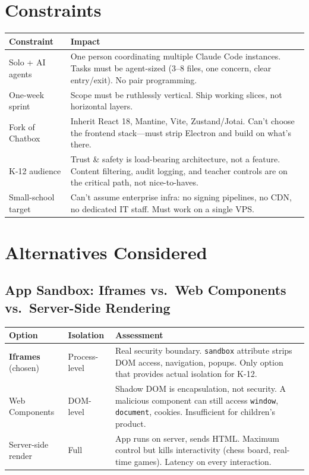 \documentclass[11pt,letterpaper]{article}
\begin{document}
\section*{Constraints}

\begin{tabularx}{\textwidth}{l X}
\toprule
\textbf{Constraint} & \textbf{Impact} \\
\midrule
Solo + AI agents & One person coordinating multiple Claude Code instances. Tasks must be agent-sized (3--8 files, one concern, clear entry/exit). No pair programming. \\
One-week sprint & Scope must be ruthlessly vertical. Ship working slices, not horizontal layers. \\
Fork of Chatbox & Inherit React 18, Mantine, Vite, Zustand/Jotai. Can't choose the frontend stack---must strip Electron and build on what's there. \\
K-12 audience & Trust \& safety is load-bearing architecture, not a feature. Content filtering, audit logging, and teacher controls are on the critical path, not nice-to-haves. \\
Small-school target & Can't assume enterprise infra: no signing pipelines, no CDN, no dedicated IT staff. Must work on a single VPS. \\
\bottomrule
\end{tabularx}

\section*{Alternatives Considered}

\subsection*{App Sandbox: Iframes vs.\ Web Components vs.\ Server-Side Rendering}

\begin{tabularx}{\textwidth}{l l X}
\toprule
\textbf{Option} & \textbf{Isolation} & \textbf{Assessment} \\
\midrule
\textbf{Iframes} {\color{cbgreen}(chosen)} & Process-level & Real security boundary. \texttt{sandbox} attribute strips DOM access, navigation, popups. Only option that provides actual isolation for K-12. \\
Web Components & DOM-level & Shadow DOM is encapsulation, not security. A malicious component can still access \texttt{window}, \texttt{document}, cookies. Insufficient for children's product. \\
Server-side render & Full & App runs on server, sends HTML. Maximum control but kills interactivity (chess board, real-time games). Latency on every interaction. \\
\bottomrule
\end{tabularx}
\end{document}
